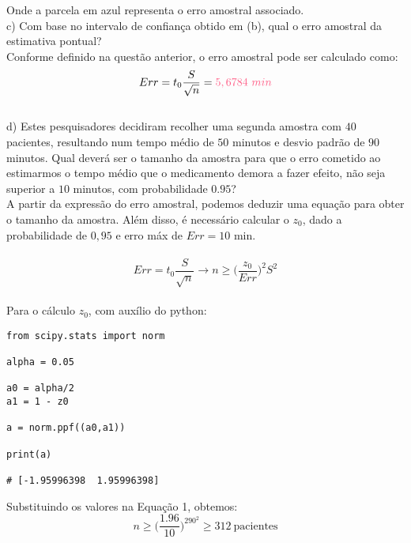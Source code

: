 Onde a parcela em \textcolor{deepblue}{azul} representa o erro amostral associado.\\

c) Com base no intervalo de confiança obtido em (b), qual o erro amostral da estimativa pontual?\\

Conforme definido na questão anterior, o erro amostral pode ser calculado como:\\

\[
    Err = t_0\frac{S}{\sqrt{n}} = \textcolor{COLOR2}{5,6784\ min}
\]
\\

d) Estes pesquisadores decidiram recolher uma segunda amostra com $40$ pacientes, resultando num tempo médio de $50$ minutos e desvio padrão de $90$ minutos. Qual deverá ser o tamanho da amostra para que o erro cometido ao estimarmos o tempo médio que o medicamento demora a fazer efeito, não seja superior a $10$ minutos, com probabilidade $0.95$?\\

A partir da expressão do erro amostral, podemos deduzir uma equação para obter o tamanho da amostra. Além disso, é necessário calcular o $z_0$, dado a probabilidade de $0,95$ e erro máx de $Err=10$ min.\\
\\

\begin{equation}
    Err = t_0\frac{S}{\sqrt{n}} \to n\geqslant \biggl(\frac{z_0}{Err}\biggr)^2 S^2
\end{equation}
\\

Para o cálculo $z_0$, com auxílio do python:\\

\begin{lstlisting}
from scipy.stats import norm
    
alpha = 0.05
            
a0 = alpha/2
a1 = 1 - z0
    
a = norm.ppf((a0,a1))
            
print(a)
    
# [-1.95996398  1.95996398]
\end{lstlisting}

Substituindo os valores na Equação 1, obtemos:\\

\[
    n\geqslant \biggl(\frac{1.96}{10}\biggr)^290^2 \geqslant 312\ \text{pacientes}
\]
\\

